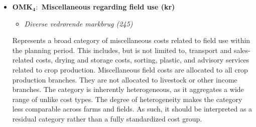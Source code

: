 \documentclass[12pt]{article}
\begin{document}
\begin{itemize}
    \item[] \textbf{OMK$_\textbf{4}:$ Miscellaneous regarding field use (kr)}
    \begin{itemize}
        \item[$+$] \textit{Diverse vedrørende markbrug (245)}
    \end{itemize}
    Represents a broad category of miscellaneous costs related to field use within the planning period. 
    This includes, but is not limited to, transport and sales-related costs, drying and storage costs, sorting, plastic, and advisory services related to crop production.
    Miscellaneous field costs are allocated to all crop production branches. 
    They are not allocated to livestock or other income branches.
    The category is inherently heterogeneous, as it aggregates a wide range of unlike cost types. The degree of heterogeneity makes the category less comparable across farms and fields. 
    As such, it should be interpreted as a residual category rather than a fully standardized cost group.
\end{itemize} 
\end{document}
